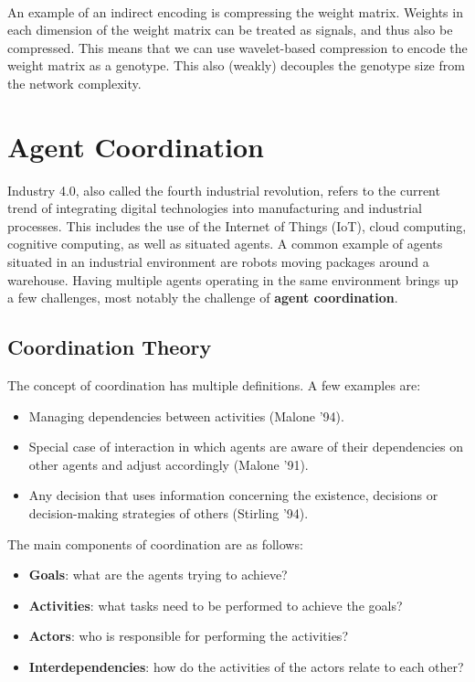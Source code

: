 \documentclass[12pt]{article}
\begin{document}
\noindent
\\
An example of an indirect encoding is compressing the weight matrix.
Weights in each dimension of the weight matrix can be treated as signals, and thus also be compressed.
This means that we can use wavelet-based compression to encode the weight matrix as a genotype.
This also (weakly) decouples the genotype size from the network complexity.

%
%
\newpage
\section{Agent Coordination}
Industry 4.0, also called the fourth industrial revolution, refers to the current trend of integrating digital technologies into manufacturing and industrial processes.
This includes the use of the Internet of Things (IoT), cloud computing, cognitive computing, as well as situated agents.
A common example of agents situated in an industrial environment are robots moving packages around a warehouse.
Having multiple agents operating in the same environment brings up a few challenges, most notably the challenge of \textbf{agent coordination}.

\subsection{Coordination Theory}
The concept of coordination has multiple definitions.
A few examples are:

\begin{itemize}
    \item Managing dependencies between activities (Malone '94).
    \item Special case of interaction in which agents are aware of their dependencies on other agents and adjust accordingly (Malone '91).
    \item Any decision that uses information concerning the existence, decisions or decision-making strategies of others (Stirling '94).
\end{itemize}

\noindent
The main components of coordination are as follows:

\begin{itemize}
    \item \textbf{Goals}: what are the agents trying to achieve?
    \item \textbf{Activities}: what tasks need to be performed to achieve the goals?
    \item \textbf{Actors}: who is responsible for performing the activities?
    \item \textbf{Interdependencies}: how do the activities of the actors relate to each other?
\end{itemize}
\end{document}
